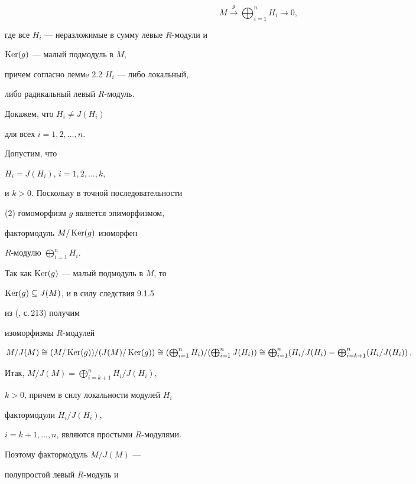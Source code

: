 \begin{pf}
\begin{equation}
M \overset{g}{\longrightarrow}{} \bigoplus_{i=1}^n H_i 


\longrightarrow 0, 


\end{equation}


где все $H_i$ --- неразложимые в сумму левые $R$-модули и


$\operatorname{Ker} (g)$ --- малый подмодуль в $M$, 


причем согласно леммe 2.2 $H_i$ --- либо локальный,


либо радикальный левый $R$-модуль.


 


Докажем, что $H_{i} \neq J(H_{i})$ 


для всех $i=1,2, \dotsc ,n$.


Допустим, что 


$H_{i}=J(H_{i})$, $i=1,2,\dotsc ,k$,


и $k>0$. Поскольку в точной последовательности


(2) гомоморфизм $g$ является эпиморфизмом,


фактормодуль $M/ \operatorname{Ker}(g)$ изоморфен 


$R$-модулю $\bigoplus_{i=1}^n H_{i}$. 





Так как $\operatorname{Ker} (g)$ --- малый подмодуль в $M$, то 


$\operatorname{Ker} (g) \subseteq J(M)$, и в силу следствия 9.1.5


из (\cite{kasch}, с.\,213) получим 


изоморфизмы $R$-модулей 


$M/J(M) \cong (M/ \Ker(g))/(J(M)/ \Ker(g))


\cong (\bigoplus_{i=1}^n H_i)/(\bigoplus_{i=1}^n J(H_i)) 


\cong \bigoplus_{i=1}^n (H_i/J(H_i) 


= \bigoplus_{i=k+1}^n (H_i/ J(H_i))$.





Итак, $M/J(M) = \bigoplus\limits_{i=k+1}^n H_{i}/ J(H_{i})$,


$k>0$, причем в силу локальности модулей $H_i$ 


фактормодули $H_i / J(H_i)$, 


$i=k+1,\dotsc, n$, являются простыми $R$-модулями.


Поэтому фактормодуль $M/J(M)$ ---


полупростой левый $R$-модуль и 



\end{pf}
